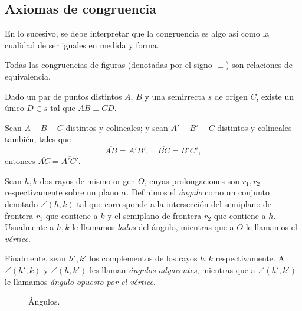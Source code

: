 \documentclass[11pt,a4paper]{book}
\begin{document}
\subsection*{Axiomas de congruencia}
En lo sucesivo, se debe interpretar que la congruencia es algo así como la cualidad de ser iguales en medida y forma.
\begin{axiom}[IV, 1]
Todas las congruencias de figuras (denotadas por el signo $\equiv$)  son relaciones de equivalencia.
\end{axiom}
\begin{axiom}[IV, 2]
Dado un par de puntos distintos $A,\,B$ y una semirrecta $s$ de origen $C$, existe un único $D\in s$ tal que $\overline{AB}\equiv\overline{CD}$.
\end{axiom}
\begin{axiom}[IV, 3]
Sean $A-B-C$ distintos y colineales; y sean $A'-B'-C$ distintos y colineales también, tales que
$$\overline{AB}=\overline{A'B'},\quad\overline{BC}=\overline{B'C'},$$
entonces $\overline{AC}=\overline{A'C'}$.
\end{axiom}
\begin{mydef}[Ángulo]
Sean $h,k$ dos rayos de mismo origen $O$, cuyas prolongaciones son $r_1, r_2$ respectivamente sobre un plano $\alpha$. Definimos el \textit{ángulo} como un conjunto denotado $\angle(h,k)$
tal que corresponde a la intersección del semiplano de frontera $r_1$ que contiene a $k$ y el semiplano de frontera $r_2$ que contiene a $h$. Usualmente a $h,k$ le llamamos \textit{lados} del ángulo, mientras que a $O$ le llamamos el \textit{vértice}.
\end{mydef}
Finalmente, sean $h',k'$ los complementos de los rayos $h,k$ respectivamente. A $\angle(h',k)$ y $\angle(h,k')$ les llaman \textit{ángulos adyacentes}, mientras que a $\angle(h',k')$ le llamamos \textit{ángulo opuesto por el vértice}.
\begin{figure}[!ht]
\centering
{}
\caption{Ángulos.}
\end{figure}
\end{document}
